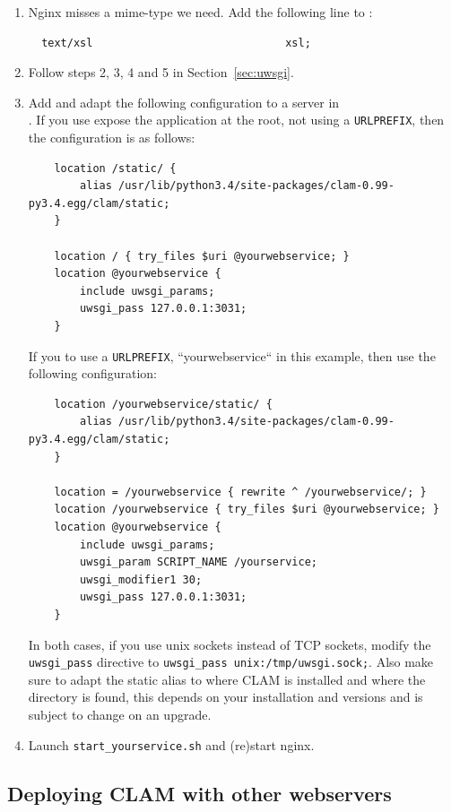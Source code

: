 \documentclass[a4paper,12pt,twoside,openright]{report}
\begin{document}
\begin{enumerate}[leftmargin=5mm]
\item Nginx misses a mime-type we need. Add the following
    line to :
{ \small
\begin{verbatim}
  text/xsl                              xsl;
\end{verbatim}
}

\item Follow steps 2, 3, 4 and 5 in Section~\ref{sec:uwsgi}.

\item Add and adapt the following configuration to a server in \\
    . If you use expose the application at the
        root, not using a \texttt{URLPREFIX}, then the configuration is as
        follows:
\begin{verbatim}
    location /static/ {
        alias /usr/lib/python3.4/site-packages/clam-0.99-py3.4.egg/clam/static;
    }

    location / { try_files $uri @yourwebservice; }
    location @yourwebservice {
        include uwsgi_params;
        uwsgi_pass 127.0.0.1:3031;
    }
\end{verbatim}
If you to use a \texttt{URLPREFIX}, ``yourwebservice`` in this example, then
use the following configuration:
{ \small
\begin{verbatim}
    location /yourwebservice/static/ {
        alias /usr/lib/python3.4/site-packages/clam-0.99-py3.4.egg/clam/static;
    }

    location = /yourwebservice { rewrite ^ /yourwebservice/; }
    location /yourwebservice { try_files $uri @yourwebservice; }
    location @yourwebservice {
        include uwsgi_params;
        uwsgi_param SCRIPT_NAME /yourservice;
        uwsgi_modifier1 30;
        uwsgi_pass 127.0.0.1:3031;
    }
\end{verbatim}
In both cases, if you use unix sockets instead of TCP sockets, modify the \texttt{uwsgi\_pass} directive
to \texttt{uwsgi\_pass unix:/tmp/uwsgi.sock;}. Also make sure to adapt the static alias to where CLAM is
installed and where the  directory is found, this depends on your
installation and versions and is subject to change on an upgrade.
}
\item Launch \texttt{start\_yourservice.sh}  and (re)start nginx.
\end{enumerate}


\subsection{Deploying CLAM with other webservers}
\end{document}
